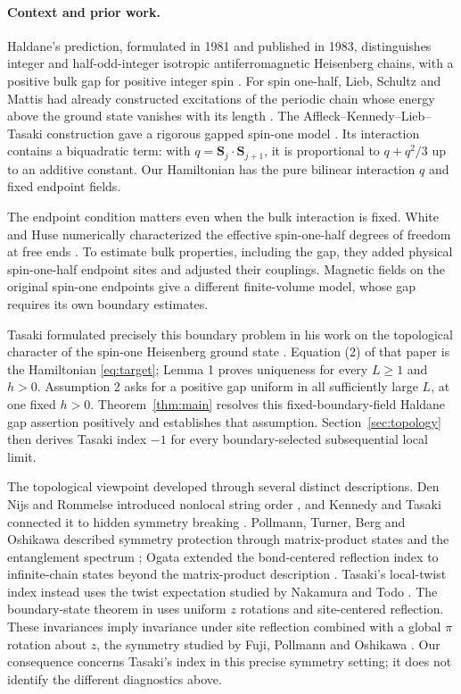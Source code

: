 \documentclass[11pt]{article}
\theoremstyle{remark}
\numberwithin{equation}{section}
\begin{document}
\paragraph{Context and prior work.}
Haldane's prediction, formulated in 1981 and published in 1983,
distinguishes integer and half-odd-integer isotropic antiferromagnetic
Heisenberg chains, with a positive bulk gap for positive integer spin
\cite{Haldane1981,Haldane1983PLA,Haldane1983PRL}.
For spin one-half, Lieb, Schultz and Mattis had already constructed
excitations of the periodic chain whose energy above the ground state
vanishes with its length \cite[Appendix B]{LSM1961}.
The Affleck--Kennedy--Lieb--Tasaki construction gave a rigorous gapped
spin-one model \cite{AKLT1987,AKLT1988}. Its interaction contains a
biquadratic term: with $q=\mathbf S_j\cdot\mathbf S_{j+1}$, it is
proportional to $q+q^2/3$ up to an additive constant. Our Hamiltonian
has the pure bilinear interaction $q$ and fixed endpoint fields.

The endpoint condition matters even when the bulk interaction is
fixed. White and Huse numerically characterized the effective
spin-one-half degrees of freedom at free ends \cite{WhiteHuse1993}.
To estimate bulk properties, including the gap, they added physical
spin-one-half endpoint sites and adjusted their couplings. Magnetic
fields on the original spin-one endpoints give a different
finite-volume model, whose gap requires its own boundary estimates.

Tasaki formulated precisely this boundary problem in his work on the
topological character of the spin-one Heisenberg ground state
\cite{Tasaki2025}. Equation (2) of that paper is the Hamiltonian
\eqref{eq:target}; Lemma 1 proves uniqueness for every $L\ge1$ and
$h>0$. Assumption 2 asks for a positive gap uniform in all sufficiently
large $L$, at one fixed $h>0$. Theorem~\ref{thm:main} resolves this
fixed-boundary-field Haldane gap assertion positively and establishes
that assumption. Section~\ref{sec:topology} then derives Tasaki index
$-1$ for every boundary-selected subsequential local limit.

The topological viewpoint developed through several distinct
descriptions. Den Nijs and Rommelse introduced nonlocal string order
\cite{DenNijsRommelse1989}, and Kennedy and Tasaki connected it to
hidden symmetry breaking \cite{KennedyTasaki1992}. Pollmann, Turner,
Berg and Oshikawa described symmetry protection through matrix-product
states and the entanglement spectrum \cite{Pollmann2010}; Ogata
extended the bond-centered reflection index to infinite-chain states
beyond the matrix-product description \cite{Ogata2021}.
Tasaki's local-twist index \cite{Tasaki2018} instead uses the twist
expectation studied by Nakamura and Todo \cite{NakamuraTodo2002}.
The boundary-state theorem in \cite{Tasaki2025} uses uniform $z$
rotations and site-centered reflection. These invariances imply
invariance under site reflection combined with a global $\pi$ rotation
about $z$, the symmetry studied by Fuji, Pollmann and Oshikawa
\cite{FujiPollmannOshikawa2015}.
Our consequence concerns Tasaki's index in this precise symmetry
setting; it does not identify the different diagnostics above.
\end{document}
